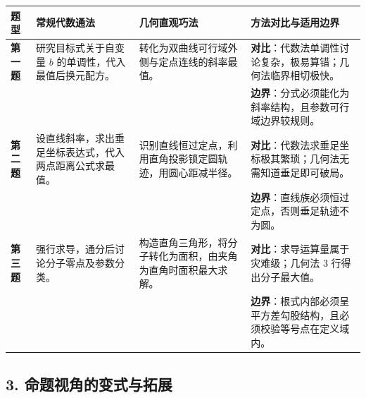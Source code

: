 \documentclass[11pt,a4paper]{ctexart}
\begin{document}
\begin{center}
\renewcommand{\arraystretch}{1.3}
\begin{tabularx}{0.98\linewidth}{l p{4.2cm} p{4.2cm} X}
\toprule
\textbf{题型} & \textbf{常规代数通法} & \textbf{几何直观巧法} & \textbf{方法对比与适用边界} \\
\midrule
\textbf{第一题} & 研究目标式关于自变量 $b$ 的单调性，代入最值后换元配方。 & 转化为双曲线可行域外侧与定点连线的斜率最值。 & \textbf{对比}：代数法单调性讨论复杂，极易算错；几何法临界相切极快。\\
& & & \textbf{边界}：分式必须能化为斜率结构，且参数可行域边界较规则。 \\
\midrule
\textbf{第二题} & 设直线斜率，求出垂足坐标表达式，代入两点距离公式求最值。 & 识别直线恒过定点，利用直角投影锁定圆轨迹，用圆心距减半径。 & \textbf{对比}：代数法求垂足坐标极其繁琐；几何法无需知道垂足即可破局。\\
& & & \textbf{边界}：直线族必须恒过定点，否则垂足轨迹不为圆。 \\
\midrule
\textbf{第三题} & 强行求导，通分后讨论分子零点及参数分类。 & 构造直角三角形，将分子转化为面积，由夹角为直角时面积最大求解。 & \textbf{对比}：求导运算量属于灾难级；几何法 3 行得出分子最大值。\\
& & & \textbf{边界}：根式内部必须呈平方差勾股结构，且必须校验等号点在定义域内。 \\
\bottomrule
\end{tabularx}
\end{center}

\subsection{3. 命题视角的变式与拓展}
\end{document}
